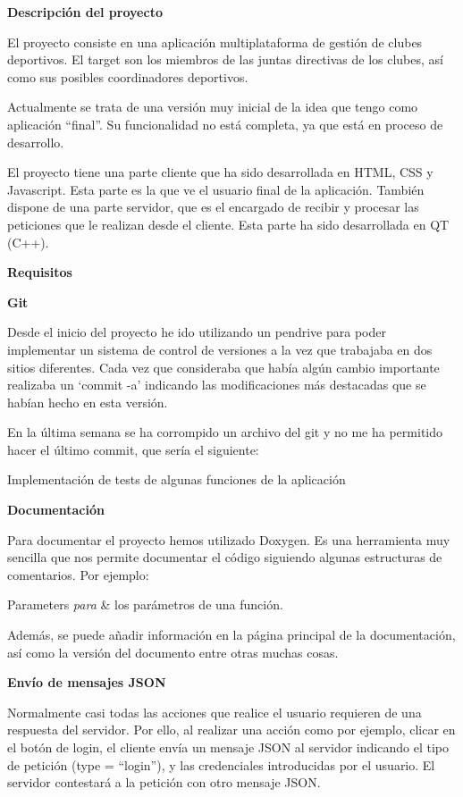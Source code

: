 



{\bfseries Descripción del proyecto}

El proyecto consiste en una aplicación multiplataforma de gestión de clubes deportivos. El target son los miembros de las juntas directivas de los clubes, así como sus posibles coordinadores deportivos.

Actualmente se trata de una versión muy inicial de la idea que tengo como aplicación “final”. Su funcionalidad no está completa, ya que está en proceso de desarrollo.

El proyecto tiene una parte cliente que ha sido desarrollada en H\+T\+ML, C\+SS y Javascript. Esta parte es la que ve el usuario final de la aplicación. También dispone de una parte servidor, que es el encargado de recibir y procesar las peticiones que le realizan desde el cliente. Esta parte ha sido desarrollada en QT (C++).

{\bfseries Requisitos}

{\bfseries Git}

Desde el inicio del proyecto he ido utilizando un pendrive para poder implementar un sistema de control de versiones a la vez que trabajaba en dos sitios diferentes. Cada vez que consideraba que había algún cambio importante realizaba un ‘commit -\/a’ indicando las modificaciones más destacadas que se habían hecho en esta versión.

En la última semana se ha corrompido un archivo del git y no me ha permitido hacer el último commit, que sería el siguiente\+:

Implementación de tests de algunas funciones de la aplicación

{\bfseries Documentación}

Para documentar el proyecto hemos utilizado Doxygen. Es una herramienta muy sencilla que nos permite documentar el código siguiendo algunas estructuras de comentarios. Por ejemplo\+:
\begin{DoxyParams}{Parameters}
{\em para} & los parámetros de una función.\\
\hline
\end{DoxyParams}
Además, se puede añadir información en la página principal de la documentación, así como la versión del documento entre otras muchas cosas.

{\bfseries Envío de mensajes J\+S\+ON}

Normalmente casi todas las acciones que realice el usuario requieren de una respuesta del servidor. Por ello, al realizar una acción como por ejemplo, clicar en el botón de login, el cliente envía un mensaje J\+S\+ON al servidor indicando el tipo de petición (type = “login”), y las credenciales introducidas por el usuario. El servidor contestará a la petición con otro mensaje J\+S\+ON.

